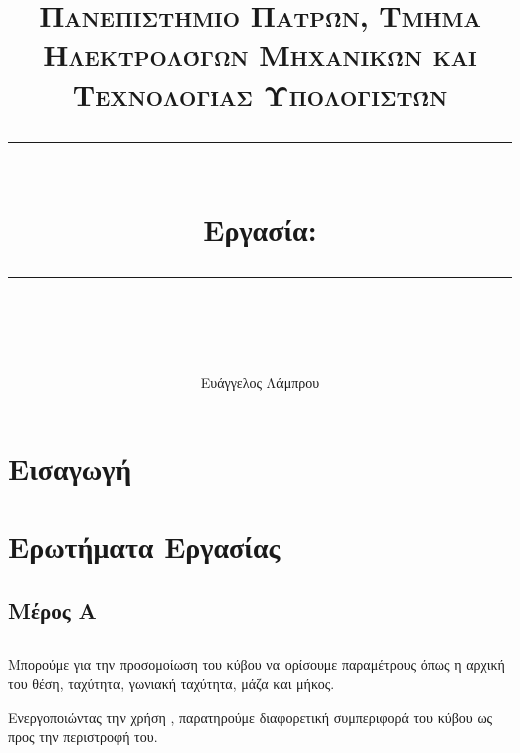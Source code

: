\documentclass[11pt]{scrartcl} %
\title{	
	\normalfont\normalsize
	\textsc{Πανεπιστήμιο Πατρών, Τμήμα Ηλεκτρολόγων Μηχανικών και Τεχνολογίας Υπολογιστών}\\ %
	\vspace{25pt} %
	\rule{\linewidth}{0.5pt}\\ %
	\vspace{20pt} %
	{\Large Εργασία: \en{Pokemon}}\\ %
	\vspace{12pt} %
	\rule{\linewidth}{2pt}\\ %
	\vspace{12pt} %
}
\author{\LARGE Ευάγγελος Λάμπρου \\ \en{UP1066519}} %
\date{} %
\begin{document}
\maketitle 

\tableofcontents

\newpage

\section{Εισαγωγή}

\section{Ερωτήματα Εργασίας}

\subsection{Μέρος Α}

\subsection{}
\subsubsection{}

Μπορούμε για την προσομοίωση του κύβου να ορίσουμε παραμέτρους όπως η αρχική του θέση, ταχύτητα, 
γωνιακή ταχύτητα, μάζα και μήκος. 

Ενεργοποιώντας την χρήση , παρατηρούμε διαφορετική συμπεριφορά του κύβου ως προς την περιστροφή του.
\end{document}
